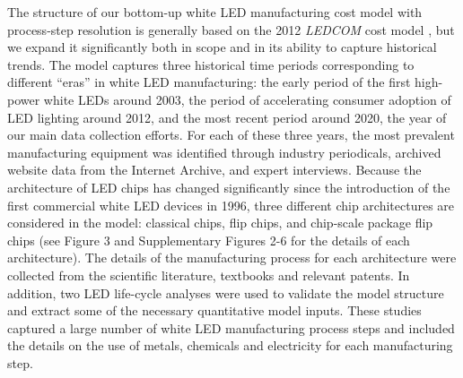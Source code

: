 \documentclass[parskip=full]{article}
\begin{document}
The structure of our bottom-up white LED manufacturing cost model with process-step resolution is generally based on the 2012 \textit{LEDCOM} cost model \cite{ledcomv2}, but we expand it significantly both in scope and in its ability to capture historical trends. The model captures three historical time periods corresponding to different “eras” in white LED manufacturing: the early period of the first high-power white LEDs around 2003, the period of accelerating consumer adoption of LED lighting around 2012, and the most recent period around 2020, the year of our main data collection efforts. For each of these three years, the most prevalent manufacturing equipment was identified through industry periodicals, archived website data from the Internet Archive, and expert interviews. Because the architecture of LED chips has changed significantly since the introduction of the first commercial white LED devices in 1996, three different chip architectures are considered in the model: classical chips, flip chips, and chip-scale package flip chips (see Figure 3 and Supplementary Figures 2-6 for the details of each architecture). The details of the manufacturing process for each architecture were collected from the scientific literature, textbooks and relevant patents. In addition, two LED life-cycle analyses were used to validate the model structure and extract some of the necessary quantitative model inputs. These studies captured a large number of white LED manufacturing process steps and included the details on the use of metals, chemicals and electricity for each manufacturing step.
\end{document}
